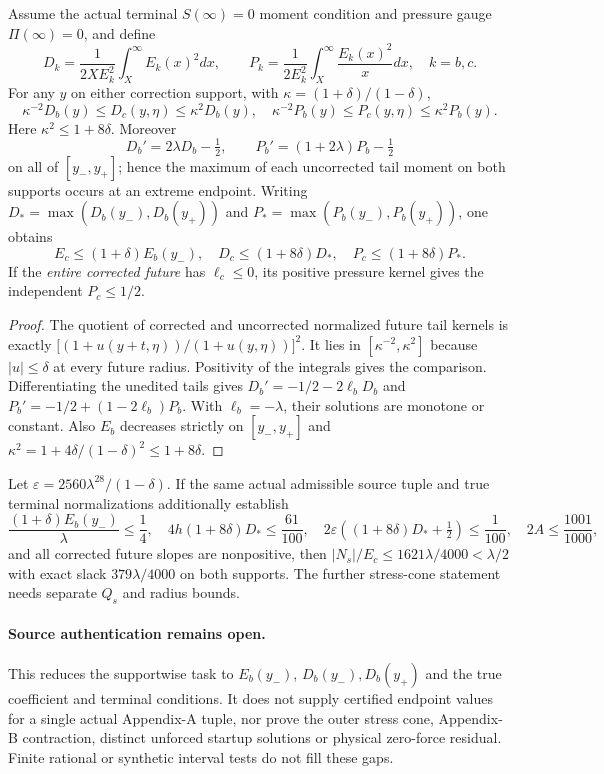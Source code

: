 \begin{theorem}
\label{thm:a11-endpoint-tails}
Assume the actual terminal $S(\infty)=0$ moment condition and
pressure gauge $\Pi(\infty)=0$, and define
\[
 D_k=\frac1{2XE_k^2}\int_X^\infty E_k(x)^2dx,\qquad
 P_k=\frac1{2E_k^2}\int_X^\infty\frac{E_k(x)^2}{x}dx,
 \quad k=b,c.
\]
For any $y$ on either correction support, with
$\kappa=(1+\delta)/(1-\delta)$,
\[
 \kappa^{-2}D_b(y)\le D_c(y,\eta)\le\kappa^2D_b(y),
 \quad
 \kappa^{-2}P_b(y)\le P_c(y,\eta)\le\kappa^2P_b(y).
\]
Here $\kappa^2\le1+8\delta$. Moreover
\[
 D_b'=2\lambda D_b-\tfrac12,\qquad
 P_b'=(1+2\lambda)P_b-\tfrac12
\]
on all of $[y_-,y_+]$; hence the maximum of each uncorrected
tail moment on both supports occurs at an extreme endpoint.
Writing $D_*=\max(D_b(y_-),D_b(y_+))$ and
$P_*=\max(P_b(y_-),P_b(y_+))$, one obtains
\[
 E_c\le(1+\delta)E_b(y_-),\quad
 D_c\le(1+8\delta)D_*,\quad
 P_c\le(1+8\delta)P_*.
\]
If the \emph{entire corrected future} has $\ell_c\le0$, its
positive pressure kernel gives the independent $P_c\le1/2$.
\end{theorem}
\begin{proof}
The quotient of corrected and uncorrected normalized future
tail kernels is exactly
$\bigl[(1+u(y+t,\eta))/(1+u(y,\eta))\bigr]^2$.
It lies in $[\kappa^{-2},\kappa^2]$ because
$|u|\le\delta$ at every future radius. Positivity of the
integrals gives the comparison. Differentiating the unedited
tails gives $D_b'=-1/2-2\ell_bD_b$ and
$P_b'=-1/2+(1-2\ell_b)P_b$. With $\ell_b=-\lambda$,
their solutions are monotone or constant. Also $E_b$ decreases
strictly on $[y_-,y_+]$ and
$\kappa^2=1+4\delta/(1-\delta)^2\le1+8\delta$.
\end{proof}

\begin{corollary}
\label{cor:a11-three-values}
Let $\varepsilon=2560\lambda^{28}/(1-\delta)$.
If the same actual admissible source tuple and true terminal
normalizations additionally establish
\[
\frac{(1+\delta)E_b(y_-)}{\lambda}\le\frac14,\quad
4h(1+8\delta)D_*\le\frac{61}{100},\quad
2\varepsilon((1+8\delta)D_*+\tfrac12)\le\frac1{100},\quad
2A\le\frac{1001}{1000},
\]
and all corrected future slopes are nonpositive, then
$|N_s|/E_c\le1621\lambda/4000<\lambda/2$ with
exact slack $379\lambda/4000$ on both supports. The further
stress-cone statement needs separate $Q_s$ and radius bounds.
\end{corollary}

\paragraph{Source authentication remains open.}
This reduces the supportwise task to $E_b(y_-)$,
$D_b(y_-),D_b(y_+)$ and the true coefficient and
terminal conditions. It does not supply certified endpoint
values for a single actual Appendix-A tuple, nor prove the
outer stress cone, Appendix-B contraction, distinct unforced
startup solutions or physical zero-force residual. Finite
rational or synthetic interval tests do not fill these gaps.
